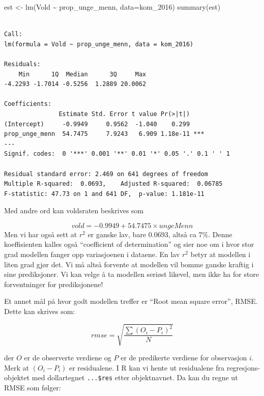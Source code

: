 \documentclass[
  letterpaper,
  DIV=11,
  numbers=noendperiod]{scrreprt}
\newenvironment{Shaded}{\begin{snugshade}}{\end{snugshade}}
\newcommand{\AttributeTok}[1]{\textcolor[rgb]{0.40,0.45,0.13}{#1}}
\newcommand{\DecValTok}[1]{\textcolor[rgb]{0.68,0.00,0.00}{#1}}
\newcommand{\FunctionTok}[1]{\textcolor[rgb]{0.28,0.35,0.67}{#1}}
\newcommand{\NormalTok}[1]{\textcolor[rgb]{0.00,0.23,0.31}{#1}}
\newcommand{\OtherTok}[1]{\textcolor[rgb]{0.00,0.23,0.31}{#1}}
\newcommand{\SpecialCharTok}[1]{\textcolor[rgb]{0.37,0.37,0.37}{#1}}
\theoremstyle{definition}
\theoremstyle{remark}
\begin{document}
\begin{Shaded}
\begin{Highlighting}[]
\NormalTok{est }\OtherTok{\textless{}{-}} \FunctionTok{lm}\NormalTok{(Vold }\SpecialCharTok{\textasciitilde{}}\NormalTok{ prop\_unge\_menn, }\AttributeTok{data=}\NormalTok{kom\_2016)}
\FunctionTok{summary}\NormalTok{(est)}
\end{Highlighting}
\end{Shaded}

\begin{verbatim}

Call:
lm(formula = Vold ~ prop_unge_menn, data = kom_2016)

Residuals:
    Min      1Q  Median      3Q     Max 
-4.2293 -1.7014 -0.5256  1.2889 20.0062 

Coefficients:
               Estimate Std. Error t value Pr(>|t|)    
(Intercept)     -0.9949     0.9562  -1.040    0.299    
prop_unge_menn  54.7475     7.9243   6.909 1.18e-11 ***
---
Signif. codes:  0 '***' 0.001 '**' 0.01 '*' 0.05 '.' 0.1 ' ' 1

Residual standard error: 2.469 on 641 degrees of freedom
Multiple R-squared:  0.0693,    Adjusted R-squared:  0.06785 
F-statistic: 47.73 on 1 and 641 DF,  p-value: 1.181e-11
\end{verbatim}

Med andre ord kan voldsraten beskrives som

\[ vold = -0.9949 + 54.7475 \times ungeMenn  \] Men vi har også sett at
\(r^2\) er ganske lav, bare 0.0693, altså ca 7\%. Denne koeffisienten
kalles også ``coefficient of determination'' og sier noe om i hvor stor
grad modellen fanger opp variasjoenen i dataene. En lav \(r^2\) betyr at
modellen i liten grad gjør det. Vi må altså forvente at modellen vil
bomme ganske kraftig i sine prediksjoner. Vi kan velge å ta modellen
seriøst likevel, men ikke ha for store forventninger for prediksjonene!

Et annet mål på hvor godt modellen treffer er ``Root mean square
error'', RMSE. Dette kan skrives som:

\[ rmse = \sqrt{ \frac{ \sum{(O_i-P_i)^2} }{N} }  \]

der \(O\) er de observerte verdiene og \(P\) er de predikerte verdiene
for observasjon \(i\). Merk at \((O_i-P_i)\) er residualene. I R kan vi
hente ut residualene fra regresjons-objektet med dollartegnet
\texttt{...\$res} etter objektnavnet. Da kan du regne ut RMSE som
følger:

\begin{Shaded}
\end{Shaded}
\end{document}
